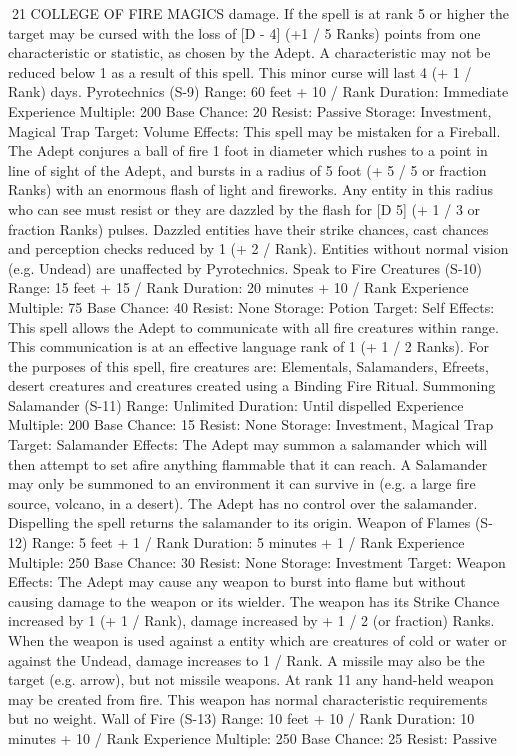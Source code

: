 \documentclass[a4paper]{article}
\begin{document}
\begin{multicols}{3}
21 COLLEGE OF FIRE MAGICS
damage. If the spell is at rank 5 or higher the target
may be cursed with the loss of [D - 4] (+1 / 5
Ranks) points from one characteristic or statistic,
as chosen by the Adept. A characteristic may not
be reduced below 1 as a result of this spell. This
minor curse will last 4 (+ 1 / Rank) days.
Pyrotechnics (S-9)
Range: 60 feet + 10 / Rank
Duration: Immediate
Experience Multiple: 200
Base Chance: 20%
Resist: Passive
Storage: Investment, Magical Trap
Target: Volume
Effects: This spell may be mistaken for a Fireball.
The Adept conjures a ball of fire 1 foot in diameter
which rushes to a point in line of sight of the
Adept, and bursts in a radius of 5 foot (+ 5 / 5 or
fraction Ranks) with an enormous flash of light and
fireworks. Any entity in this radius who can see
must resist or they are dazzled by the flash for [D 5] (+ 1 / 3 or fraction Ranks) pulses. Dazzled entities have their strike chances, cast chances and
perception checks reduced by 1 (+ 2 / Rank). Entities without normal vision (e.g. Undead) are unaffected by Pyrotechnics.
Speak to Fire Creatures (S-10)
Range: 15 feet + 15 / Rank
Duration: 20 minutes + 10 / Rank
Experience Multiple: 75
Base Chance: 40%
Resist: None
Storage: Potion
Target: Self
Effects: This spell allows the Adept to communicate with all fire creatures within range. This
communication is at an effective language rank of
1 (+ 1 / 2 Ranks). For the purposes of this spell,
fire creatures are: Elementals, Salamanders,
Efreets, desert creatures and creatures created
using a Binding Fire Ritual.
Summoning Salamander (S-11)
Range: Unlimited
Duration: Until dispelled
Experience Multiple: 200
Base Chance: 15%
Resist: None
Storage: Investment, Magical Trap
Target: Salamander
Effects: The Adept may summon a salamander
which will then attempt to set afire anything flammable that it can reach. A Salamander may only be
summoned to an environment it can survive in (e.g.
a large fire source, volcano, in a desert). The Adept
has no control over the salamander. Dispelling the
spell returns the salamander to its origin.
Weapon of Flames (S-12)
Range: 5 feet + 1 / Rank
Duration: 5 minutes + 1 / Rank
Experience Multiple: 250
Base Chance: 30%
Resist: None
Storage: Investment
Target: Weapon
Effects: The Adept may cause any weapon to burst
into flame but without causing damage to the
weapon or its wielder. The weapon has its Strike
Chance increased by 1 (+ 1 / Rank), damage increased by + 1 / 2 (or fraction) Ranks. When the
weapon is used against a entity which are creatures
of cold or water or against the Undead, damage
increases to 1 / Rank. A missile may also be the
target (e.g. arrow), but not missile weapons. At
rank 11 any hand-held weapon may be created
from fire. This weapon has normal characteristic
requirements but no weight.
Wall of Fire (S-13)
Range: 10 feet + 10 / Rank
Duration: 10 minutes + 10 / Rank
Experience Multiple: 250
Base Chance: 25%
Resist: Passive


\end{multicols}
\end{document}
